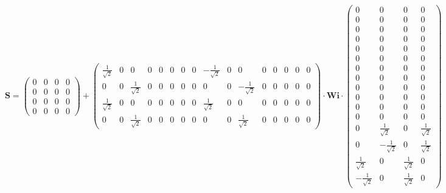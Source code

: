 \[ \mathbf{S} = \left(\begin{smallmatrix} 0 & 0 & 0 & 0 \\ 0 & 0 & 0 &
0 \\ 0 & 0 & 0 & 0 \\ 0 & 0 & 0 & 0 \end{smallmatrix}\right) +
\left(\begin{smallmatrix} \frac{1}{\sqrt{2}} & 0 & 0 & 0 & 0 & 0 & 0 &
0 & -\frac{1}{\sqrt{2}} & 0 & 0 & 0 & 0 & 0 & 0 & 0 \\ 0 & 0 &
\frac{1}{\sqrt{2}} & 0 & 0 & 0 & 0 & 0 & 0 & 0 & -\frac{1}{\sqrt{2}} &
0 & 0 & 0 & 0 & 0 \\ \frac{1}{\sqrt{2}} & 0 & 0 & 0 & 0 & 0 & 0 & 0 &
\frac{1}{\sqrt{2}} & 0 & 0 & 0 & 0 & 0 & 0 & 0 \\ 0 & 0 &
\frac{1}{\sqrt{2}} & 0 & 0 & 0 & 0 & 0 & 0 & 0 & \frac{1}{\sqrt{2}} &
0 & 0 & 0 & 0 & 0 \end{smallmatrix}\right) \cdot \mathbf{Wi}
\cdot\left(\begin{smallmatrix} 0 & 0 & 0 & 0 \\ 0 & 0 & 0 & 0 \\ 0 & 0
& 0 & 0 \\ 0 & 0 & 0 & 0 \\ 0 & 0 & 0 & 0 \\ 0 & 0 & 0 & 0 \\ 0 & 0 &
0 & 0 \\ 0 & 0 & 0 & 0 \\ 0 & 0 & 0 & 0 \\ 0 & 0 & 0 & 0 \\ 0 & 0 & 0
& 0 \\ 0 & 0 & 0 & 0 \\ 0 & \frac{1}{\sqrt{2}} & 0 &
\frac{1}{\sqrt{2}} \\ 0 & -\frac{1}{\sqrt{2}} & 0 & \frac{1}{\sqrt{2}}
\\ \frac{1}{\sqrt{2}} & 0 & \frac{1}{\sqrt{2}} & 0 \\
-\frac{1}{\sqrt{2}} & 0 & \frac{1}{\sqrt{2}} & 0
\end{smallmatrix}\right) \]
